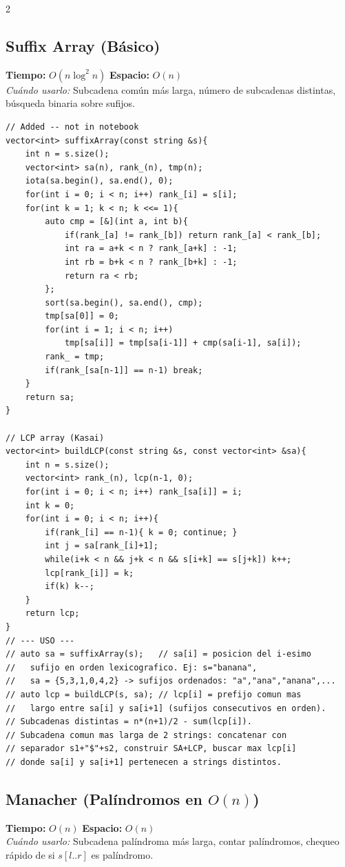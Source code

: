 \documentclass[10pt,a4paper]{article}
\begin{document}
\begin{multicols}{2}
\subsection{Suffix Array (B\'asico)}
\textbf{Tiempo:} $O(n \log^2 n)$ \quad \textbf{Espacio:} $O(n)$\\
\textit{Cu\'ando usarlo:} Subcadena com\'un m\'as larga, n\'umero de subcadenas distintas, b\'usqueda binaria sobre sufijos.

\begin{lstlisting}
// Added -- not in notebook
vector<int> suffixArray(const string &s){
    int n = s.size();
    vector<int> sa(n), rank_(n), tmp(n);
    iota(sa.begin(), sa.end(), 0);
    for(int i = 0; i < n; i++) rank_[i] = s[i];
    for(int k = 1; k < n; k <<= 1){
        auto cmp = [&](int a, int b){
            if(rank_[a] != rank_[b]) return rank_[a] < rank_[b];
            int ra = a+k < n ? rank_[a+k] : -1;
            int rb = b+k < n ? rank_[b+k] : -1;
            return ra < rb;
        };
        sort(sa.begin(), sa.end(), cmp);
        tmp[sa[0]] = 0;
        for(int i = 1; i < n; i++)
            tmp[sa[i]] = tmp[sa[i-1]] + cmp(sa[i-1], sa[i]);
        rank_ = tmp;
        if(rank_[sa[n-1]] == n-1) break;
    }
    return sa;
}

// LCP array (Kasai)
vector<int> buildLCP(const string &s, const vector<int> &sa){
    int n = s.size();
    vector<int> rank_(n), lcp(n-1, 0);
    for(int i = 0; i < n; i++) rank_[sa[i]] = i;
    int k = 0;
    for(int i = 0; i < n; i++){
        if(rank_[i] == n-1){ k = 0; continue; }
        int j = sa[rank_[i]+1];
        while(i+k < n && j+k < n && s[i+k] == s[j+k]) k++;
        lcp[rank_[i]] = k;
        if(k) k--;
    }
    return lcp;
}
// --- USO ---
// auto sa = suffixArray(s);   // sa[i] = posicion del i-esimo
//   sufijo en orden lexicografico. Ej: s="banana",
//   sa = {5,3,1,0,4,2} -> sufijos ordenados: "a","ana","anana",...
// auto lcp = buildLCP(s, sa); // lcp[i] = prefijo comun mas
//   largo entre sa[i] y sa[i+1] (sufijos consecutivos en orden).
// Subcadenas distintas = n*(n+1)/2 - sum(lcp[i]).
// Subcadena comun mas larga de 2 strings: concatenar con
// separador s1+"$"+s2, construir SA+LCP, buscar max lcp[i]
// donde sa[i] y sa[i+1] pertenecen a strings distintos.
\end{lstlisting}


\subsection{Manacher (Pal\'indromos en $O(n)$)}
\textbf{Tiempo:} $O(n)$ \quad \textbf{Espacio:} $O(n)$\\
\textit{Cu\'ando usarlo:} Subcadena pal\'indroma m\'as larga, contar pal\'indromos, chequeo r\'apido de si $s[l..r]$ es pal\'indromo.


\end{multicols}
\end{document}
